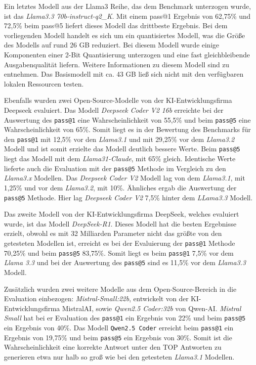 Ein letztes Modell aus der Llama3 Reihe, das dem Benchmark unterzogen wurde, ist das \textit{Llama3.3 70b-instruct-q2\_K}. Mit einem pass@1 Ergebnis von 62,75\% und 72,5\% beim pass@5 liefert dieses Modell das drittbeste Ergebnis. Bei dem vorliegenden Modell handelt es sich um ein quantisiertes Modell, was die Größe des Modells auf rund 26 GB reduziert. Bei diesem Modell wurde einige Komponenten einer 2-Bit Quantisierung unterzogen und eine fast gleichbleibende Ausgabenqualität liefern. Weitere Informationen zu diesem Modell sind \cite{hugging-face-2025} zu entnehmen. Das Basismodell mit ca. 43 GB ließ sich nicht mit den verfügbaren lokalen Ressourcen testen.\vspace{0.2cm}

Ebenfalls wurden zwei Open-Source-Modelle von der KI-Entwicklungsfirma Deepseek evaluiert.
Das Modell \textit{Deepseek Coder V2 16b} erreichte bei der Auswertung des \texttt{pass@1} eine Wahrscheinlichkeit von 55,5\% und beim \texttt{pass@5} eine Wahrscheinlichkeit von 65\%. Somit liegt es in der Bewertung des Benchmarks für den \texttt{pass@1} mit 12,5\% vor den \textit{Llama3.1} und mit 29,25\% vor dem \textit{Llama3.2} Modell und ist somit erzielte das Modell deutlich bessere Werte. Beim \texttt{pass@5} liegt das Modell mit dem \textit{Llama31-Claude}, mit 65\% gleich. Identische Werte lieferte auch die Evaluation mit der \texttt{pass@5} Methode im Vergleich zu den \textit{Llama3.x} Modellen. Das \textit{Deepseek Coder V2} Modell lag von dem \textit{Llama3.1}, mit 1,25\% und vor dem \textit{Llama3.2}, mit 10\%. Ähnliches ergab die Auswertung der \texttt{pass@5} Methode. Hier lag \textit{Deepseek Coder V2} 7,5\% hinter dem \textit{LLama3.3} Modell.\vspace{0.2cm}

Das zweite Modell von der KI-Entwicklungsfirma DeepSeek, welches evaluiert wurde, ist das Modell \textit{DeepSeek-R1}. Dieses Modell hat die besten Ergebnisse erzielt, obwohl es mit 32 Milliarden Parameter nicht das größte von den getesteten Modellen ist, erreicht es bei der Evaluierung der \texttt{pass@1} Methode 70,25\% und beim \texttt{pass@5} 83,75\%. Somit liegt es beim \texttt{pass@1} 7,5\% vor dem \textit{Llama 3.3} und bei der Auswertung des \texttt{pass@5} sind es 11,5\% vor dem \textit{Llama3.3} Modell.\vspace{0.2cm}

Zusätzlich wurden zwei weitere Modelle aus dem Open-Source-Bereich in die Evaluation einbezogen: \textit{Mistral-Small:22b}, entwickelt von der KI-Entwicklungsfirma MistralAI, sowie \textit{Qwen2.5 Coder:32b} von Qwen-AI. \textit{Mistral  Small} hat bei er Evaluation des \texttt{pass@1} ein Ergebnis von 22\% und beim \texttt{pass@5} ein Ergebnis von 40\%. Das Modell \texttt{Qwen2.5 Coder} erreicht beim \texttt{pass@1} ein Ergebnis von 19,75\% und beim \texttt{pass@5} ein Ergebnis von 30\%. Somit ist die Wahrscheinlichkeit eine korrekte Antwort unter den TOP Antworten zu generieren etwa nur halb so groß wie bei den getesteten \textit{Llama3.1} Modellen.


